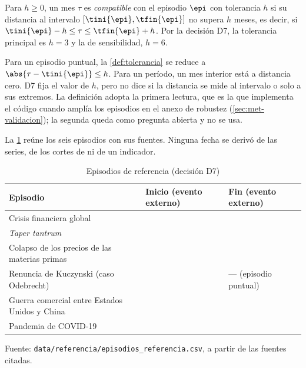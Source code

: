 \begin{definicion}\label{def:tolerancia}
Para $h\ge0$, un mes $\tau$ es \emph{compatible} con el episodio $\epi$ con tolerancia $h$ si su
distancia al intervalo $[\tini{\epi},\tfin{\epi}]$ no supera $h$ meses, es decir, si
$\tini{\epi}-h\le\tau\le\tfin{\epi}+h$. Por la decisión D7, la tolerancia principal es $h=3$ y la de
sensibilidad, $h=6$.
\end{definicion}

\begin{observacion}\label{obs:tolerancia}
Para un episodio puntual, la \cref{def:tolerancia} se reduce a $\abs{\tau-\tini{\epi}}\le h$. Para un
período, un mes interior está a distancia cero. D7 fija el valor de $h$, pero no dice si la
distancia se mide al intervalo o solo a sus extremos. La definición adopta la primera lectura, que
es la que implementa el código cuando amplía los episodios en el anexo de robustez
(\cref{sec:met-validacion}); la segunda queda como pregunta abierta y no se usa.
\end{observacion}

La \cref{tab:episodios} reúne los seis episodios con sus fuentes. Ninguna fecha se derivó de las
series, de los cortes de \textcite{camiz_cerda_atoche_2026} ni de un indicador.

\begin{table}[htbp]
\centering
\small
\caption{Episodios de referencia (decisión D7)}
\label{tab:episodios}
\begin{tabular}{@{}p{}p{}p{}@{}}
\toprule
Episodio & Inicio (evento externo) & Fin (evento externo) \\
\midrule
Crisis financiera global & \episodioCrisisInicio{} \parencite{lehman_brothers_2008} &
  \episodioCrisisFin{} \parencite{nber_2010} \\
\emph{Taper tantrum} & \episodioTaperInicio{} \parencite{bernanke_2013} &
  \episodioTaperFin{} \parencite{reserva_federal_2013} \\
Colapso de los precios de las materias primas & \episodioMateriasInicio{}
  \parencite{stocker_et_al_2015} & \episodioMateriasFin{} \parencite{fmi_2016} \\
Renuncia de Kuczynski (caso Odebrecht) & \episodioKuczynskiInicio{} \parencite{congreso_2018} &
  --- (episodio puntual) \\
Guerra comercial entre Estados Unidos y China & \episodioGuerraInicio{} \parencite{ustr_2018} &
  \episodioGuerraFin{} \parencite{ustr_2020} \\
Pandemia de COVID-19 & \episodioCovidInicio{} \parencite{oms_2020b} &
  \episodioCovidFin{} \parencite{nber_2021} \\
\bottomrule
\end{tabular}

\smallskip
\begin{minipage}{\textwidth}\footnotesize
Fuente: \texttt{data/referencia/episodios\_referencia.csv}, a partir de las fuentes citadas.
\end{minipage}
\end{table}

